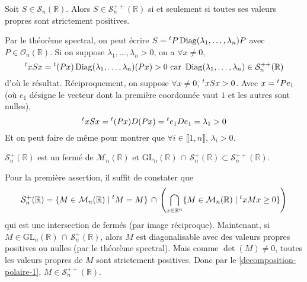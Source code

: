 




	\begin{lemma}
		\label{decomposition-polaire-1}
		Soit $S \in \mathcal{S}_n(\mathbb{R})$. Alors $S \in \mathcal{S}_n^{++}(\mathbb{R})$ si et seulement si toutes ses valeurs propres sont strictement positives.
	\end{lemma}

	\begin{demonstration}
		Par le théorème spectral, on peut écrire $S = \mathstrut ^t P \operatorname{Diag}(\lambda_1, \dots, \lambda_n) P$ avec $P \in \mathcal{O}_n(\mathbb{R})$. Si on suppose $\lambda_1, \dots, \lambda_n > 0$, on a $\forall x \neq 0$,
		\[ \mathstrut ^t x S x = \mathstrut ^t (Px) \operatorname{Diag}(\lambda_1, \dots, \lambda_n) (Px) > 0 \text{ car } \operatorname{Diag}(\lambda_1, \dots, \lambda_n) \in \mathcal{S}_n^{++}(\mathbb{R}) \]
		d'où le résultat.
		\newpar
		Réciproquement, on suppose $\forall x \neq 0$, $\mathstrut ^t x S x > 0$. Avec $x = \mathstrut ^t P e_1$ (où $e_1$ désigne le vecteur dont la première coordonnée vaut $1$ et les autres sont nulles),
		\[ \mathstrut ^t x S x = \mathstrut ^t (Px) D (Px) = \mathstrut ^t e_1 D e_1 = \lambda_1 > 0 \]
		Et on peut faire de même pour montrer que $\forall i \in \llbracket 1, n \rrbracket$, $\lambda_i > 0$.
	\end{demonstration}

	\begin{lemma}
		\label{decomposition-polaire-2}
		$\mathcal{S}_n^+(\mathbb{R})$ est un fermé de $\mathcal{M}_n(\mathbb{R})$ et $\mathrm{GL}_n(\mathbb{R}) \, \cap \, \mathcal{S}_n^{+}(\mathbb{R}) \subset \mathcal{S}_n^{++}(\mathbb{R})$.
	\end{lemma}

	\begin{demonstration}
		Pour la première assertion, il suffit de constater que
		\[ \mathcal{S}_n^+(\mathbb{R}) = \{ M \in \mathcal{M}_n(\mathbb{R}) \mid \mathstrut ^t M = M \} \, \cap \, \left( \bigcap_{x \in \mathbb{R}^n} \{ M \in \mathcal{M}_n(\mathbb{R}) \mid \mathstrut ^t x M x \geq 0 \} \right) \]
		qui est une intersection de fermés (par image réciproque). Maintenant, si $M \in \mathrm{GL}_n(\mathbb{R}) \, \cap \, \mathcal{S}_n^{+}(\mathbb{R})$, alors $M$ est diagonalisable avec des valeurs propres positives ou nulles (par le théorème spectral). Mais comme $\det(M) \neq 0$, toutes les valeurs propres de $M$ sont strictement positives. Donc par le \cref{decomposition-polaire-1}, $M \in \mathcal{S}_n^{++}(\mathbb{R})$.
	\end{demonstration}

